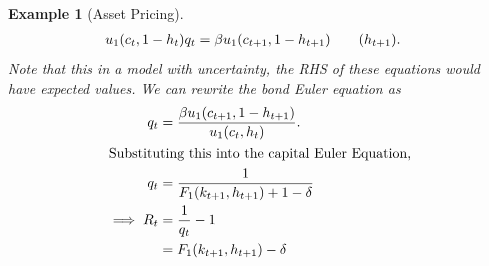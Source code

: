 \documentclass[11pt]{article}
\newtheorem*{example}{Example}
\begin{document}
\begin{example}[Asset Pricing]
\begin{align*}
u_1(c_t, 1 - h_t) q_t &= \beta u_1(c_{t + 1}, 1 - h_{t+ 1})\tag{$h_{t + 1}$}.
\end{align*}
Note that this in a model with uncertainty, the RHS of these equations would have expected values. We can rewrite the bond Euler equation as
\begin{align*}
q_t &= \frac{\beta u_1(c_{t + 1}, 1 - h_{t + 1})}{u_1(c_t, h_t)}.\\
\intertext{Substituting this into the capital Euler Equation,}
q_t &= \frac{1}{F_1(k_{t + 1}, h_{t + 1}) + 1 - \delta}\\
\implies R_t &= \frac{1}{q_t} - 1\\
&= F_1(k_{t + 1}, h_{t + 1}) - \delta
\end{align*}
\end{example}
\end{document}
